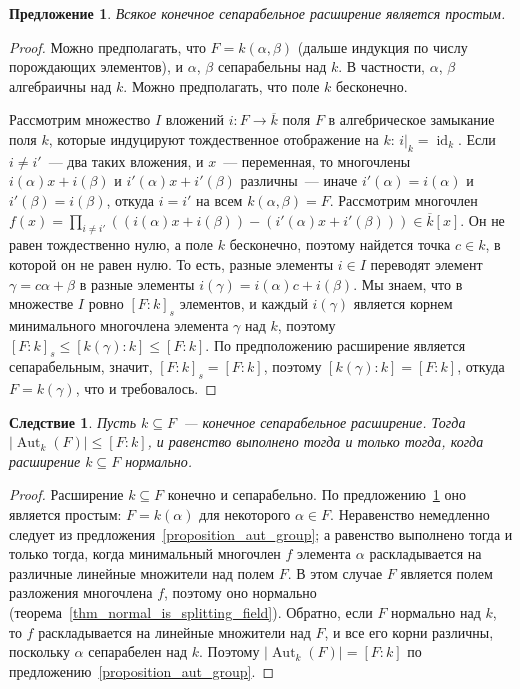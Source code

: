 \documentclass[a4paper,11pt]{scrartcl}
\theoremstyle{plain}
\newtheorem{corollary}[theorem]{Следствие}
\newtheorem{proposition}[theorem]{Предложение}
\theoremstyle{definition}
\newcommand\sseq{\subseteq}
\newcommand\id{\operatorname{id}}
\newcommand\Aut{\operatorname{Aut}}
\begin{document}
\begin{proposition}\label{proposition_separable_is_simple}
Всякое конечное сепарабельное расширение является простым.
\end{proposition}
\begin{proof}
Можно предполагать, что $F=k(\alpha,\beta)$ (дальше индукция по числу
порождающих элементов), и $\alpha$, $\beta$ сепарабельны над $k$. В
частности, $\alpha$, $\beta$ алгебраичны над $k$. Можно предполагать,
что поле $k$ бесконечно.

Рассмотрим множество $I$ вложений $i\colon F\to\overline{k}$ поля $F$
в алгебрическое замыкание поля $k$, которые индуцируют тождественное
отображение на $k$: $i|_k=\id_k$. Если $i\neq i'$~--- два таких
вложения, и $x$~--- переменная, то многочлены $i(\alpha)x+i(\beta)$ и
$i'(\alpha)x+i'(\beta)$ различны~--- иначе $i'(\alpha)=i(\alpha)$ и
$i'(\beta)=i(\beta)$,
откуда $i=i'$ на всем $k(\alpha,\beta)=F$.
Рассмотрим многочлен
$f(x)=\prod_{i\neq i'}((i(\alpha)x+i(\beta)) -
(i'(\alpha)x+i'(\beta)))\in\overline{k}[x]$. Он не равен
тождественно нулю, а поле $k$ бесконечно, поэтому найдется точка $c\in
k$, в которой он не равен нулю. То есть, разные элементы $i\in I$
переводят элемент $\gamma=c\alpha+\beta$ в разные элементы
$i(\gamma)=i(\alpha)c+i(\beta)$. Мы знаем, что в множестве $I$ ровно
$[F:k]_s$ элементов, и каждый $i(\gamma)$ является корнем минимального
многочлена элемента $\gamma$ над $k$, поэтому $[F:k]_s\leq
[k(\gamma):k] \leq [F:k]$. По предположению расширение является
сепарабельным, значит, $[F:k]_s=[F:k]$, поэтому $[k(\gamma):k]=[F:k]$,
откуда $F=k(\gamma)$, что и требовалось.
\end{proof}

\begin{corollary}\label{corr_group_of_separable}
Пусть $k\sseq F$~--- конечное сепарабельное расширение. Тогда
$|\Aut_k(F)|\leq[F:k]$, и равенство выполнено тогда и только тогда,
когда расширение $k\sseq F$ нормально.
\end{corollary}
\begin{proof}
Расширение $k\sseq F$ конечно и сепарабельно. По
предложению~\ref{proposition_separable_is_simple} оно является
простым: $F=k(\alpha)$ для некоторого $\alpha\in F$. Неравенство
немедленно
следует из предложения~\ref{proposition_aut_group}; а равенство
выполнено тогда и только тогда, когда минимальный многочлен $f$
элемента $\alpha$ раскладывается на различные линейные множители над
полем
$F$. В этом случае $F$ является полем разложения многочлена $f$,
поэтому оно нормально
(теорема~\ref{thm_normal_is_splitting_field}). Обратно, если $F$
нормально над $k$, то $f$ раскладывается на линейные множители над
$F$, и все его корни различны, поскольку $\alpha$ сепарабелен над
$k$. Поэтому $|\Aut_k(F)|=[F:k]$ по
предложению~\ref{proposition_aut_group}.
\end{proof}
\end{document}
